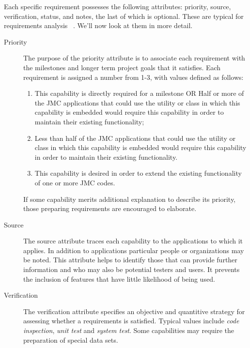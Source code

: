 
Each specific requirement possesses the following attributes:  priority, 
source, verification, status, and notes, the last of which is optional.  
These are typical for requirements
analysis ~\cite{wiegers}.  We'll now look at them in more detail.

\begin{description}
\item [Priority] The purpose of the priority attribute is to associate
each requirement with the milestones and longer term project goals that 
it satisfies.  Each requirement is assigned a number from 1-3, with
values defined as follows:
\begin{enumerate}

\item This capability is directly required for a milestone OR
Half or more of the JMC applications that could use the utility or class
in which this capability is embedded would require this
capability in order to maintain their existing functionality;
 
\item Less than half of the JMC applications that could use
the utility or class in which this capability is embedded 
would require this capability in order to maintain their existing
functionality.

\item This capability is desired in order to extend
the existing functionality of one or more JMC codes.

\end{enumerate}

If some capability merits additional explanation to describe 
its priority, those preparing requirements are encouraged 
to elaborate.
 
\item [Source] The source attribute traces each capability
to the applications to which it applies.  In addition to applications
particular people or organizations may be noted.   This attribute 
helps to identify those that can provide further 
information and who may also be potential testers and users.  It
prevents the inclusion of features that have little likelihood of
being used.

\item [Verification] The verification attribute specifies an objective
and quantitive strategy for assessing whether a requirements is
satisfied.  Typical values include {\it code inspection}, 
{\it unit test} and {\it system test}.
Some capabilities may require the preparation of special data sets.


\end{description}
